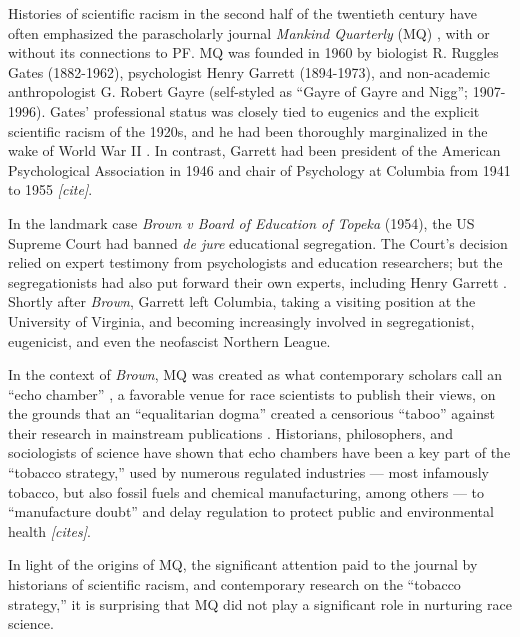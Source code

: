 \documentclass[12pt]{article}
\begin{document}
Histories of scientific racism in the second half of the twentieth century have often emphasized the parascholarly journal \emph{Mankind Quarterly} (MQ) \cite{
MehlerFoundationFascismNew1989,
WinstonScienceServiceFar1998,
SchafferScientificRacismAgain2007,
SainiSuperiorReturnRace2019,
WinstonScientificRacismNorth2020,
AdamsMisAppropriationBiological2021,
SainiDraperMillionsPhilanthropic2022
}, with or without its connections to PF. MQ was founded in 1960 by biologist R. Ruggles Gates (1882-1962), psychologist Henry Garrett (1894-1973), and non-academic anthropologist G. Robert Gayre (self-styled as ``Gayre of Gayre and Nigg''; 1907-1996). Gates' professional status was closely tied to eugenics and the explicit scientific racism of the 1920s, and he had been thoroughly marginalized in the wake of World War II \cite{WinstonScienceServiceFar1998}. In contrast, Garrett had been president of the American Psychological Association in 1946 and chair of Psychology at Columbia from 1941 to 1955 \emph{{[}cite{]}}.

In the landmark case \emph{Brown v Board of Education of Topeka} (1954), the US Supreme Court had banned \emph{de jure} educational segregation. The Court's decision relied on expert testimony from psychologists and education researchers; but the segregationists had also put forward their own experts, including Henry Garrett \cite{WinstonScienceServiceFar1998, JacksonScienceSegregationRace2005, SchafferScientificRacismAgain2007}. Shortly after \emph{Brown}, Garrett left Columbia, taking a visiting position at the University of Virginia, and becoming increasingly involved in segregationist, eugenicist, and even the neofascist Northern League.

In the context of \emph{Brown}, MQ was created as what contemporary scholars call an ``echo chamber'' \cite{FernandezPintoKnowBetterNot2017}, a favorable venue for race scientists to publish their views, on the grounds that an ``equalitarian dogma'' created a censorious ``taboo'' against their research in mainstream publications \cite{TuckerFundingScientificRacism2002, JacksonMythicalTabooRace2020}. Historians, philosophers, and sociologists of science have shown that echo chambers have been a key part of the ``tobacco strategy,'' used by numerous regulated industries --- most infamously tobacco, but also fossil fuels and chemical manufacturing, among others --- to ``manufacture doubt'' and delay regulation to protect public and environmental health \emph{{[}cites{]}}.

In light of the origins of MQ, the significant attention paid to the journal by historians of scientific racism, and contemporary research on the ``tobacco strategy,'' it is surprising that MQ did not play a significant role in nurturing race science.
\end{document}
